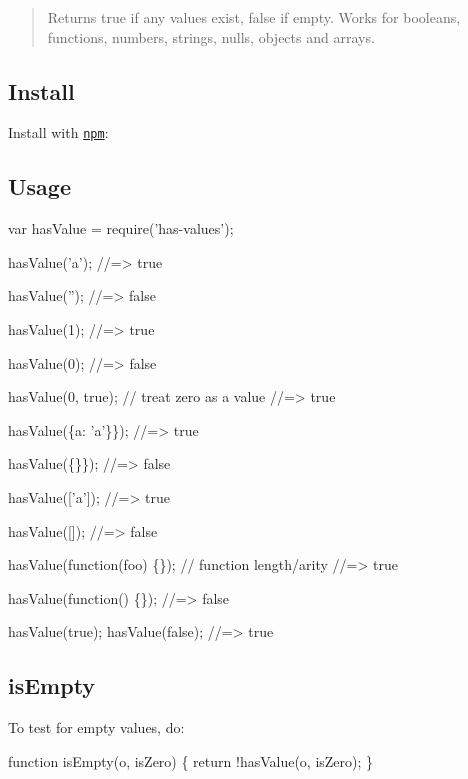 \begin{quote}
Returns true if any values exist, false if empty. Works for booleans, functions, numbers, strings, nulls, objects and arrays. \end{quote}


\subsection*{Install}

Install with \href{https://www.npmjs.com/}{\tt npm}\+:




\subsection*{Usage}


\begin{DoxyCode}
var hasValue = require('has-values');

hasValue('a');
//=> true

hasValue('');
//=> false

hasValue(1);
//=> true

hasValue(0);
//=> false

hasValue(0, true); // treat zero as a value
//=> true

hasValue(\{a: 'a'\}\});
//=> true

hasValue(\{\}\});
//=> false

hasValue(['a']);
//=> true

hasValue([]);
//=> false

hasValue(function(foo) \{\}); // function length/arity
//=> true

hasValue(function() \{\});
//=> false

hasValue(true);
hasValue(false);
//=> true
\end{DoxyCode}


\subsection*{is\+Empty}

To test for empty values, do\+:


\begin{DoxyCode}
function isEmpty(o, isZero) \{
  return !hasValue(o, isZero);
\}
\end{DoxyCode}


